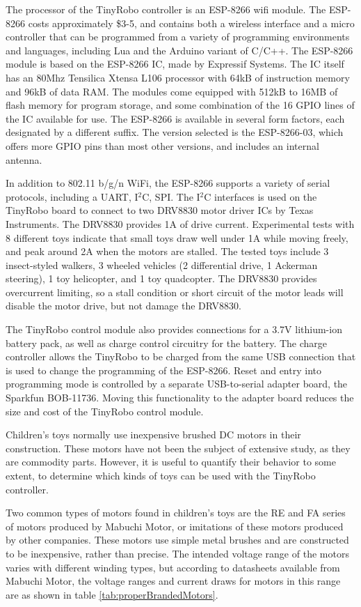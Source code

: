 \documentclass[]{article}
\begin{document}
The processor of the TinyRobo controller is an ESP-8266 wifi module.
The ESP-8266 costs approximately \$3-5, and contains both a wireless interface and a micro controller that can be programmed from a variety of programming environments and languages, including Lua and the Arduino variant of C/C++. The ESP-8266 module is based on the ESP-8266 IC, made by Expressif Systems. The IC itself has an 80Mhz Tensilica Xtensa L106 processor with 64kB of instruction memory and 96kB of data RAM. The modules come equipped with 512kB to 16MB of flash memory for program storage, and some combination of the 16 GPIO lines of the IC available for use. 
The ESP-8266 is available in several form factors, each designated by a different suffix. 
The version selected is the ESP-8266-03, which offers more GPIO pins than most other versions, and includes an internal antenna.

In addition to 802.11 b/g/n WiFi, the ESP-8266 supports a variety of serial protocols, including a UART, I$^2$C, SPI. 
The I$^2$C interfaces is used on the TinyRobo board to connect to two DRV8830 motor driver ICs by Texas Instruments. 
The DRV8830 provides 1A of drive current.
Experimental tests with 8 different toys indicate that small toys draw well under 1A while moving freely, and peak around 2A when the motors are stalled. 
The tested toys include 3 insect-styled walkers, 3 wheeled vehicles (2 differential drive, 1 Ackerman steering), 1 toy helicopter, and 1 toy quadcopter.
The DRV8830 provides overcurrent limiting, so a stall condition or short circuit of the motor leads will disable the motor drive, but not damage the DRV8830. 

The TinyRobo control module also provides connections for a 3.7V lithium-ion battery pack, as well as charge control circuitry for the battery. 
The charge controller allows the TinyRobo to be charged from the same USB connection that is used to change the programming of the ESP-8266. 
Reset and entry into programming mode is controlled by a separate USB-to-serial adapter board, the Sparkfun BOB-11736.
Moving this functionality to the adapter board reduces the size and cost of the TinyRobo control module. 

Children's toys normally use inexpensive brushed DC motors in their construction. 
These motors have not been the subject of extensive study, as they are commodity parts. 
However, it is useful to quantify their behavior to some extent, to determine which kinds of toys can be used with the TinyRobo controller. 

Two common types of motors found in children's toys are the RE and FA series of motors produced by Mabuchi Motor, or imitations of these motors produced by other companies. 
These motors use simple metal brushes and are constructed to be inexpensive, rather than precise. 
The intended voltage range of the motors varies with different winding types, but according to datasheets available from Mabuchi Motor, the voltage ranges and current draws for motors in this range are as shown in table \ref{tab:properBrandedMotors}.
\end{document}
